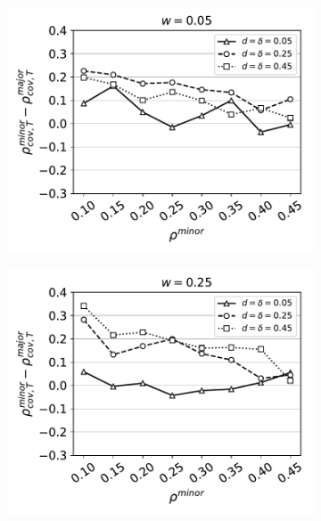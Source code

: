 \documentclass[11pt,letterpaper]{article}
\begin{document}
\begin{figure}[H]
  \centering
  \begin{subfigure}{0.31\textwidth}
    \includegraphics[width=\textwidth]{Figures/minority-homophily=0p05.pdf}
    \caption{}
  \end{subfigure}
  \begin{subfigure}{0.31\textwidth}
    \includegraphics[width=\textwidth]{Figures/minority-homophily=0p25.pdf}
    \caption{}
  \end{subfigure}
  \begin{subfigure}{0.31\textwidth}

\end{subfigure}
\end{figure}
\end{document}
